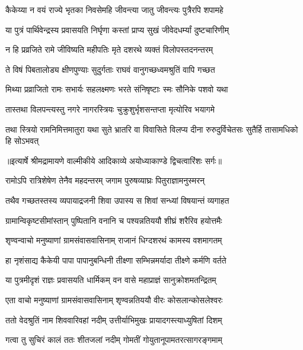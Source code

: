 \twolineshloka
{कैकेय्या न वयं राज्ये भृतका निवसेमहि}
{जीवन्त्या जातु जीवन्त्यः पुत्रैरपि शपामहे} %

\twolineshloka
{या पुत्रं पार्थिवेन्द्रस्य प्रवासयति निर्घृणा}
{कस्तां प्राप्य सुखं जीवेदधर्म्यां दुष्टचारिणीम्} %

\twolineshloka
{न हि प्रव्रजिते रामे जीविष्यति महीपतिः}
{मृते दशरथे व्यक्तं विलोपस्तदनन्तरम्} %

\twolineshloka
{ते विषं पिबतालोड्य क्षीणपुण्याः सुदुर्गताः}
{राघवं वानुगच्छध्वमश्रुतिं वापि गच्छत} %

\twolineshloka
{मिथ्या प्रव्राजितो रामः सभार्यः सहलक्ष्मणः}
{भरते संनिषृष्टाः स्मः सौनिके पशवो यथा} %

\twolineshloka
{तास्तथा विलपन्त्यस्तु नगरे नागरस्त्रियः}
{चुक्रुशुर्भृशसन्तप्ता मृत्योरिव भयागमे} %

\fourlineindentedshloka
{तथा स्त्रियो रामनिमित्तमातुरा}
{यथा सुते भ्रातरि वा विवासिते}
{विलप्य दीना रुरुदुर्विचेतसः}
{सुतैर्हि तासामधिको हि सोऽभवत्} %


{॥इत्यार्षे श्रीमद्रामायणे वाल्मीकीये आदिकाव्ये अयोध्याकाण्डे द्विचत्वारिंशः सर्गः॥}


\twolineshloka
{रामोऽपि रात्रिशेषेण तेनैव महदन्तरम्}
{जगाम पुरुषव्याघ्रः पितुराज्ञामनुस्मरन्} %

\twolineshloka
{तथैव गच्छतस्तस्य व्यपायाद्रजनी शिवा}
{उपास्य स शिवां सन्ध्यां विषयान्तं व्यगाहत} %

\twolineshloka
{ग्रामान्विकृष्टसीमांस्तान् पुष्पितानि वनानि च}
{पश्यन्नतिययौ शीघ्रं शरैरिव हयोत्तमैः} %

\twolineshloka
{शृण्वन्वाचो मनुष्याणां ग्रामसंवासवासिनाम्}
{राजानं धिग्दशरथं कामस्य वशमागतम्} %

\twolineshloka
{हा नृशंसाद्य कैकेयी पापा पापानुबन्धिनी}
{तीक्ष्णा सम्भिन्नमर्यादा तीक्ष्णे कर्मणि वर्तते} %

\twolineshloka
{या पुत्रमीदृशं राज्ञः प्रवासयति धार्मिकम्}
{वन वासे महाप्राज्ञं सानुक्रोशमतन्द्रितम्} %

\twolineshloka
{एता वाचो मनुष्याणां ग्रामसंवासवासिनाम्}
{शृण्वन्नतिययौ वीरः कोसलान्कोसलेश्वरः} %

\twolineshloka
{ततो वेदश्रुतिं नाम शिववारिवहां नदीम्}
{उत्तीर्याभिमुखः प्रायादगस्त्याध्युषितां दिशम्} %

\twolineshloka
{गत्वा तु सुचिरं कालं ततः शीतजलां नदीम्}
{गोमतीं गोयुतानूपामतरत्सागरङ्गमाम्} %

